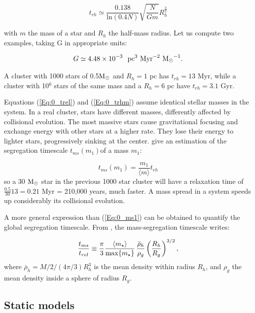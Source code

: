 \begin{equation}
\label{Eq:0_trhm}
t_{rh} \simeq   \frac{0.138}{\textrm{ln}(0.4 N)} \sqrt{ \frac{N}{G m}} R_h^\frac{3}{2}
\end{equation}

with $m$ the mass of a star and $R_h$ the half-mass radius. Let us compute two examples, taking G in appropriate units:

\begin{equation}
G \simeq 4.48 \times 10^{-3}~~ \textrm{pc}^3 ~\textrm{Myr}^{-2} ~{\textrm{M}_\odot}^{-1}.
\end{equation}

A cluster with 1000 stars of 0.5${\textrm{M}_\odot}$ and $R_{h} = 1$ pc has $t_{rh} = 13$ Myr, while a cluster with 10$^6$ stars of the same mass and a $R_{h} = 6$ pc have $t_{rh} = 3.1$ Gyr.


Equations (\ref{Eq:0_trel}) and (\ref{Eq:0_trhm}) assume identical stellar masses in the system. In a real cluster, stars have different masses, differently affected by collisional evolution. The most massive stars cause gravitational focusing and exchange energy with other stars at a higher rate. They lose their energy to lighter stars, progressively sinking at the center. \cite{Heggie2003} give an estimation of the segregation timescale $t_{ms}(m_1)$of a mass $m_1$:

\begin{equation}
\label{Eq:0_ms1}
t_{ms}(m_1) = \frac{m_1}{\langle m \rangle} t_{rh}
\end{equation} 
so a 30 ${\textrm{M}_\odot}$ star in the previous 1000 star cluster will have a relaxation time of $\frac{0.5}{30} 13 = 0.21$ Myr = 210,000 years, much faster. A mass spread in a system speeds up considerably its collisional evolution.

A more general expression than (\ref{Eq:0_ms1}) can be obtained to quantify the global segregation timescale. From \cite{Fleck2006}, the mass-segregation timescale writes:

\begin{equation}
\label{Eq:0_ms2} 
  \frac{t_{ms}}{t_{rel}} \equiv \frac{\pi}{3} \frac{\langle m_\star\rangle}{\max\{m_\star\}} \, \frac{\bar{\rho}_h}{\rho_g} \left( \frac{R_h}{R_g}\right)^{3/2} ,
\end{equation}
where $\bar{\rho}_h = M/2 /( 4\pi/3) R_h^3$ is the mean density within radius $R_h$, and $\rho_g$ the mean density inside a sphere of radius $R_g$.



\subsection{Static models}

